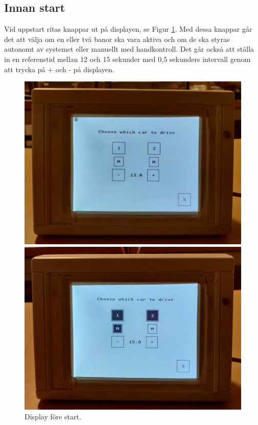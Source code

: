 \subsection{Innan start}

Vid uppstart ritas knappar ut på displayen, se Figur \ref{fig:choose}. Med dessa knappar går
det att välja om en eller två banor ska vara aktiva och om de ska styras
autonomt av systemet eller manuellt med handkontroll. Det går också att ställa
in en referenstid mellan 12 och 15 sekunder med 0,5 sekunders intervall genom
att trycka på + och - på displayen. 
\begin{figure}
	\centering
	\includegraphics[width=0.75\linewidth] {Figures/choose1}

	\vspace*{2\floatsep}%

	\centering
	\includegraphics [width=0.75\linewidth] {Figures/choose2}
	\caption{Display före start.}
	\label{fig:choose}
\end{figure}
